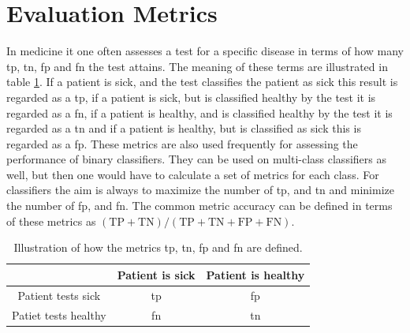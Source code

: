 \section{Evaluation Metrics} \label{sec:eval_metrics}
In medicine it one often assesses a test for a specific disease in terms of how many \acrfull{tp}, \acrfull{tn}, \acrfull{fp} and \acrfull{fn} the test attains. The meaning of these terms are illustrated in table \ref{tab:ttpnffpn}. If a patient is sick, and the test classifies the patient as sick this result is regarded as a \acrlong{tp}, if a patient is sick, but is classified healthy by the test it is regarded as a \acrlong{fn}, if a patient is healthy, and is classified healthy by the test it is regarded as a \acrlong{tn} and if a patient is healthy, but is classified as sick this is regarded as a \acrlong{fp}. These metrics are also used frequently for assessing the performance of binary classifiers. They can be used on multi-class classifiers as well, but then one would have to calculate a set of metrics for each class. For classifiers the aim is always to maximize the number of \acrshort{tp}, and \acrshort{tn} and minimize the number of \acrshort{fp}, and \acrshort{fn}. The common metric accuracy can be defined in terms of these metrics as $(\mathrm{TP} + \mathrm{TN}) / (\mathrm{TP} + \mathrm{TN} + \mathrm{FP} + \mathrm{FN})$.

\begin{table}
    \centering
    \begin{tabular}{c|c|c|}
        \toprule
                             & Patient is sick & Patient is healthy \\
        \midrule
        Patient tests sick   & \acrshort{tp}   & \acrshort{fp} \\
        \midrule
        Patiet tests healthy & \acrshort{fn}   & \acrshort{tn} \\
        \bottomrule
    \end{tabular}
    \caption{Illustration of how the metrics \acrshort{tp}, \acrshort{tn}, \acrfull{fp} and \acrfull{fn} are defined.}
    \label{tab:ttpnffpn}
\end{table}

